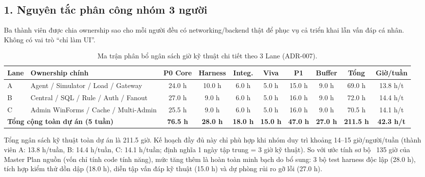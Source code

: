 
\subsection*{1. Nguyên tắc phân công nhóm 3 người}

Ba thành viên được chia ownership sao cho mỗi người đều có networking/backend thật để phục vụ cả triển khai lẫn vấn đáp cá nhân. Không có vai trò ``chỉ làm UI''.

\begin{table}[!ht]
\centering
\caption{Ma trận phân bổ ngân sách giờ kỹ thuật chi tiết theo 3 Lane (ADR-007).}
\label{tab:workload}
\scriptsize
\begin{tabularx}{\textwidth}{p{0.6cm} X c c c c c c c c}
\toprule
\textbf{Lane} & \textbf{Ownership chính} & \textbf{P0 Core} & \textbf{Harness} & \textbf{Integ.} & \textbf{Viva} & \textbf{P1} & \textbf{Buffer} & \textbf{Tổng} & \textbf{Giờ/tuần} \\
\midrule
A & Agent / Simulator / Load / Gateway & 24.0 h & 10.0 h & 6.0 h & 5.0 h & 15.0 h & 9.0 h & 69.0 h & 13.8 h/t \\
B & Central / SQL / Rule / Auth / Fanout & 27.0 h & 9.0 h & 6.0 h & 5.0 h & 16.0 h & 9.0 h & 72.0 h & 14.4 h/t \\
C & Admin WinForms / Cache / Multi-Admin & 25.5 h & 9.0 h & 6.0 h & 5.0 h & 16.0 h & 9.0 h & 70.5 h & 14.1 h/t \\
\midrule
\multicolumn{2}{l}{\textbf{Tổng cộng toàn dự án (5 tuần)}} & \textbf{76.5 h} & \textbf{28.0 h} & \textbf{18.0 h} & \textbf{15.0 h} & \textbf{47.0 h} & \textbf{27.0 h} & \textbf{211.5 h} & \textbf{42.3 h/t} \\
\bottomrule
\end{tabularx}
\end{table}

Tổng ngân sách kỹ thuật toàn dự án là 211.5 giờ. Kế hoạch đầy đủ này chỉ phù hợp khi nhóm duy trì khoảng 14--15 giờ/người/tuần (thành viên A: 13.8 h/tuần, B: 14.4 h/tuần, C: 14.1 h/tuần; định nghĩa 1 ngày tập trung = 3 giờ kỹ thuật). So với ước tính sơ bộ ~135 giờ của Master Plan nguồn (vốn chỉ tính code tính năng), mức tăng thêm là hoàn toàn minh bạch do bổ sung: 3 bộ test harness độc lập (28.0 h), tích hợp kiểm thử dồn dập (18.0 h), diễn tập vấn đáp kỹ thuật (15.0 h) và dự phòng rủi ro gỡ lỗi (27.0 h).

